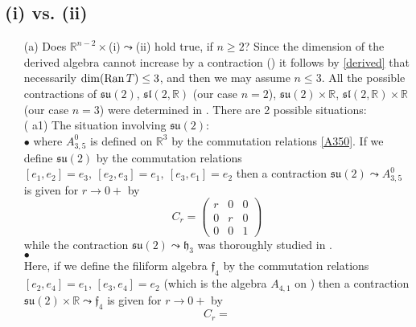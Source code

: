 \documentclass[
reqno]{amsart}
\begin{document}
\subsection{(i) vs. (ii)}\label{Case1}  
\begin{itemize}
\item[(a)] Does ${{\mathbb R}}^{n-2}\times$(i)${\leadsto}$(ii) hold true, if $n\ge 2$?  
Since the dimension of the derived algebra cannot increase by a contraction 
(\cite[Th. 1(4)]{NP06}) it follows by \eqref{derived} that necessarily $\dim({{\rm Ran}\,} T)\le 3$, 
and then we may assume $n\le 3$. 
All the possible contractions of  ${{\mathfrak s}{\mathfrak u}}(2)$, ${{\mathfrak s}{\mathfrak l}}(2,{{\mathbb R}})$ (our case $n=2$), 
${{\mathfrak s}{\mathfrak u}}(2)\times{{\mathbb R}}$, ${{\mathfrak s}{\mathfrak l}}(2,{{\mathbb R}})\times{{\mathbb R}}$ (our case $n=3$) were 
determined in \cite[pag. 26--27]{NP06}. 
There are 2 possible situations: 
\\ ({{\bfseries\itshape} a1}) The situation involving  ${{\mathfrak s}{\mathfrak u}}(2)$:  
\\ $\bullet$ 
where $A_{3,5}^0$ is defined on ${{\mathbb R}}^3$ by the commutation relations \eqref{A350}. 
If we define ${{\mathfrak s}{\mathfrak u}}(2)$ by the commutation relations 
$[e_1,e_2]=e_3,\ [e_2,e_3]=e_1,\ [e_3,e_1]=e_2$
then a contraction ${{\mathfrak s}{\mathfrak u}}(2){\leadsto} A_{3,5}^0$ is given for $r\to0+$ by 
$$C_r= 
\begin{pmatrix} 
r & 0 & 0 \\
0 & r & 0 \\
0 & 0 & 1
\end{pmatrix}$$
while the contraction ${{\mathfrak s}{\mathfrak u}}(2){\leadsto}{{\mathfrak h}}_3$ was thoroughly studied in \cite{Ca03}. 
\\ $\bullet$ 
\\ Here, if we define the filiform algebra ${{\mathfrak f}}_4$ by the commutation relations 
$[e_2,e_4]=e_1$, $[e_3,e_4]=e_2$ (which is the algebra $A_{4,1}$ on \cite[pag. 20]{NP06}) 
then a contraction ${{\mathfrak s}{\mathfrak u}}(2)\times{{\mathbb R}}{\leadsto}{{\mathfrak f}}_4$ is given for $r\to 0+$ by 
$$C_r=
$$
\end{itemize}
\end{document}
